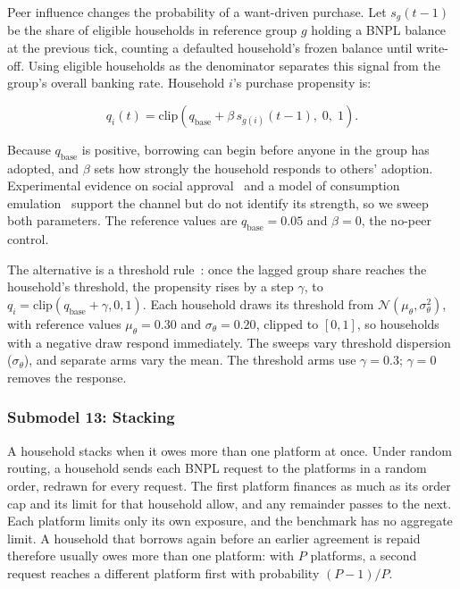 Peer influence changes the probability of a want-driven purchase. Let
$s_g(t-1)$ be the share of eligible households in reference group $g$ holding
a \ac{BNPL} balance at the previous tick, counting a defaulted household's frozen balance until
write-off. Using eligible households
as the denominator separates this signal from the group's overall banking
rate. Household $i$'s purchase propensity is:

\begin{equation}
    q_i(t) = \mathrm{clip}\!\left(q_{\text{base}} + \beta \, s_{g(i)}(t-1),\; 0,\; 1\right).
    \label{eq:peer}
\end{equation}

Because $q_{\text{base}}$ is positive, borrowing can begin before anyone in the group has
adopted, and $\beta$ sets how strongly the household responds to others' adoption. Experimental evidence on social approval~\citep{ackert2025bnpl} and a model of
consumption emulation~\citep{cardaci2018inequality} support the channel but do not
identify its strength, so we sweep both parameters. The reference values are
$q_{\text{base}}=0.05$ and $\beta=0$, the no-peer control.

The alternative is a threshold rule~\citep{granovetter1978threshold}: once the lagged group
share reaches the household's threshold, the propensity rises by a step $\gamma$, to
$q_i = \mathrm{clip}(q_{\text{base}} + \gamma,0,1)$. Each household draws its threshold from
$\mathcal{N}(\mu_\theta, \sigma_\theta^2)$, with reference values $\mu_\theta=0.30$ and
$\sigma_\theta=0.20$, clipped to $[0,1]$, so households with a negative draw
respond immediately. The sweeps vary threshold dispersion ($\sigma_\theta$),
and separate arms vary the mean. The threshold arms use $\gamma=0.3$; $\gamma=0$ removes the response.

\subsubsection*{Submodel 13: Stacking}
\label{sec:stacking}

A household stacks when it owes more than one platform at once. Under random routing, a
household sends each \ac{BNPL} request to the platforms in a random order, redrawn for every
request. The first platform finances as much as its order cap
and its limit for that household allow, and any remainder passes to the next.
Each platform limits only its own exposure, and the benchmark has no aggregate
limit. A household that borrows again before an earlier agreement is repaid therefore
usually owes more than one platform: with $P$ platforms, a second
request reaches a different platform first with probability $(P-1)/P$.

